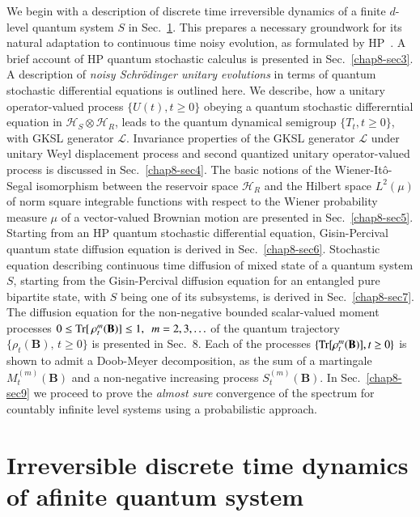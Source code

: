 We begin with a description of discrete time irreversible dynamics of a finite $d$-level quantum system $S$ in Sec.\ \ref{chap8-sec2}. This  prepares a necessary groundwork for its natural adaptation to  continuous time noisy evolution, as formulated by HP~\cite{chap8-key7,chap8-key8}. A brief account of HP quantum stochastic calculus is presented in Sec.\ \ref{chap8-sec3}. A description of  {\it noisy Schr{\"o}dinger unitary evolutions} in terms of quantum stochastic differential equations is outlined here. We describe,  how a   unitary operator-valued process $\{U(t), t\geq 0\}$ obeying a quantum stochastic differerntial equation  in $\mathcal{H}_S\otimes \mathcal{H}_R$, leads to  the quantum dynamical semigroup $\{T_t, t\geq 0\}$, with GKSL generator $\mathcal{L}$.  Invariance  properties of the GKSL generator $\mathcal{L}$ under  unitary Weyl displacement process and second quantized  unitary operator-valued process is discussed  in Sec.\ \ref{chap8-sec4}. The basic notions of the Wiener-It{\^o}-Segal isomorphism between the reservoir space $\mathcal{H}_R$ and the Hilbert space $L^2(\mu)$ of norm square integrable functions with respect to the Wiener probability measure $\mu$ of a vector-valued Brownian motion are presented in Sec.\ \ref{chap8-sec5}. Starting from an HP quantum stochastic differential equation,  Gisin-Percival~\cite{chap8-key9} quantum state diffusion equation is derived in Sec.\ \ref{chap8-sec6}.  Stochastic equation describing continuous time diffusion of mixed state of a quantum system $S$, starting from the Gisin-Percival diffusion equation for an entangled pure bipartite state, with $S$ being one of its subsystems, is derived in Sec.\ \ref{chap8-sec7}. The diffusion equation for  the non-negative bounded scalar-valued  moment processes  $0\leq {\rm Tr}[\, \rho_t^m(\mathbf{B})]\leq 1,\ \  m=2,3,\ldots$ of the quantum trajectory $\{\rho_t(\mathbf{B}),\, t\geq 0\}$ is presented in Sec.~8. Each of the processes $\{{\rm Tr}[\rho_t^m( \mathbf{B})], t\geq 0\}$ is shown to admit a Doob-Meyer decomposition,  as the sum of a martingale $M^{(m)}_t(\mathbf{B})$ and a non-negative increasing process $S^{(m)}_t(\mathbf{B})$. In Sec.\ \ref{chap8-sec9} we proceed to prove the {\em almost sure} convergence of the spectrum for countably infinite level systems using a probabilistic approach.   

\section[Irreversible discrete time dynamics of a finite quantum system]{Irreversible discrete time dynamics of a\break finite quantum system}\label{chap8-sec2}

